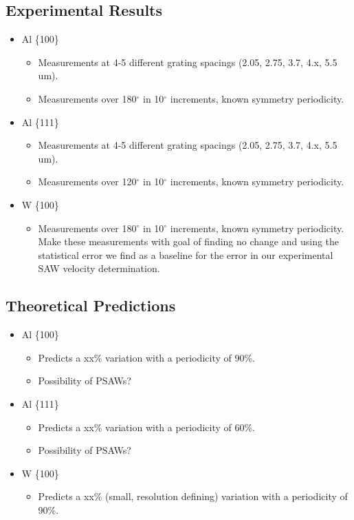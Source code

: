 
\subsection{Experimental Results}
\begin{itemize}
\item Al \{100\}
	\begin{itemize}
	\item Measurements at 4-5 different grating spacings (2.05, 2.75, 3.7, 4.x, 5.5 um).
	\item Measurements over 180$^{\circ}$ in 10$^{\circ}$ increments, known symmetry periodicity.
	\end{itemize}
\item Al \{111\}
	\begin{itemize}
	\item Measurements at 4-5 different grating spacings (2.05, 2.75, 3.7, 4.x, 5.5 um).
	\item Measurements over 120$^{\circ}$ in 10$^{\circ}$ increments, known symmetry periodicity.
	\end{itemize}
\item W \{100\}
	\begin{itemize}
	\item Measurements over 180$^{\circ}$ in 10$^{\circ}$ increments, known symmetry periodicity. Make these measurements with goal of finding no change and using the statistical error we find as a baseline for the error in our experimental SAW velocity determination. 
	\end{itemize}
\end{itemize}

\subsection{Theoretical Predictions}
\begin{itemize}
\item Al \{100\}
	\begin{itemize}
	\item Predicts a xx\% variation with a periodicity of 90\%.
	\item Possibility of PSAWs?
	\end{itemize}
\item Al \{111\}
	\begin{itemize}
	\item Predicts a xx\% variation with a periodicity of 60\%.
	\item Possibility of PSAWs?
	\end{itemize}
\item W \{100\}
	\begin{itemize}
	\item Predicts a xx\% (small, resolution defining) variation with a periodicity of 90\%.
	\end{itemize}
\end{itemize}

